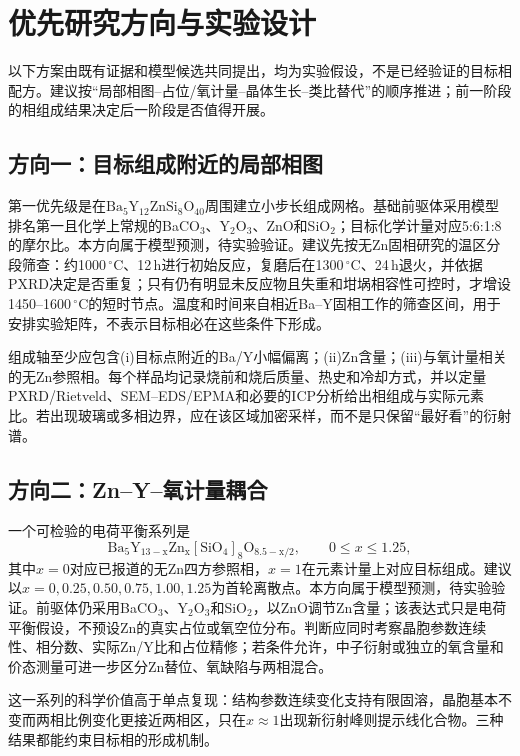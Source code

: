 \section{优先研究方向与实验设计}
\label{sec:future-directions}

以下方案由既有证据和模型候选共同提出，均为实验假设，不是已经验证的目标相配方。建议按“局部相图--占位/氧计量--晶体生长--类比替代”的顺序推进；前一阶段的相组成结果决定后一阶段是否值得开展。

\subsection{方向一：目标组成附近的局部相图}

第一优先级是在$\mathrm{Ba_5Y_{12}ZnSi_8O_{40}}$周围建立小步长组成网格。基础前驱体采用模型排名第一且化学上常规的BaCO$_3$、Y$_2$O$_3$、ZnO和SiO$_2$；目标化学计量对应5:6:1:8的摩尔比。本方向属于模型预测，待实验验证。建议先按无Zn固相研究的温区分段筛查：约1000\,$^\circ$C、12\,h进行初始反应，复磨后在1300\,$^\circ$C、24\,h退火，并依据PXRD决定是否重复；只有仍有明显未反应物且失重和坩埚相容性可控时，才增设1450--1600\,$^\circ$C的短时节点。温度和时间来自相近Ba--Y固相工作的筛查区间\cite{yamane2024microstructure,gulay2024navigation}，用于安排实验矩阵，不表示目标相必在这些条件下形成。

组成轴至少应包含(i)目标点附近的Ba/Y小幅偏离；(ii)Zn含量；(iii)与氧计量相关的无Zn参照相。每个样品均记录烧前和烧后质量、热史和冷却方式，并以定量PXRD/Rietveld、SEM--EDS/EPMA和必要的ICP分析给出相组成与实际元素比。若出现玻璃或多相边界，应在该区域加密采样，而不是只保留“最好看”的衍射谱。

\subsection{方向二：Zn--Y--氧计量耦合}

一个可检验的电荷平衡系列是
\[
\mathrm{Ba_5Y_{13-x}Zn_x[SiO_4]_8O_{8.5-x/2}},
\qquad 0\leq x\leq1.25,
\]
其中$x=0$对应已报道的无Zn四方参照相，$x=1$在元素计量上对应目标组成。建议以$x=0,0.25,0.50,0.75,1.00,1.25$为首轮离散点。本方向属于模型预测，待实验验证。前驱体仍采用BaCO$_3$、Y$_2$O$_3$和SiO$_2$，以ZnO调节Zn含量；该表达式只是电荷平衡假设，不预设Zn的真实占位或氧空位分布。判断应同时考察晶胞参数连续性、相分数、实际Zn/Y比和占位精修；若条件允许，中子衍射或独立的氧含量和价态测量可进一步区分Zn替位、氧缺陷与两相混合。

这一系列的科学价值高于单点复现：结构参数连续变化支持有限固溶，晶胞基本不变而两相比例变化更接近两相区，只在$x\approx1$出现新衍射峰则提示线化合物。三种结果都能约束目标相的形成机制。

